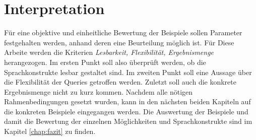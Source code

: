 \section{Interpretation}
\label{sec:interpretatin} Für eine objektive und einheitliche Bewertung der
Beispiele sollen Parameter festgehalten werden, anhand deren eine Beurteilung möglich
ist. Für Diese Arbeite werden die Kriterien \textit{Lesbarkeit, Flexibilität,
Ergebnismenge} herangezogen. Im ersten Punkt soll also überprüft werden, ob die Sprachkonstrukte
lesbar gestaltet sind. Im zweiten Punkt soll eine Aussage über die Flexibilität
der Queries getroffen werden. Zuletzt soll auch die konkrete Ergebnismenge nicht
zu kurz kommen. Nachdem alle nötigen Rahmenbedingungen gesetzt wurden, kann in den
nächsten beiden Kapiteln auf die konkreten Beispiele eingegangen werden. Die
Auswertung der Beispiele und damit die Bewertung der einzelnen Möglichkeiten und
Sprachkonstrukte sind im Kapitel \ref{chap:fazit} zu finden.